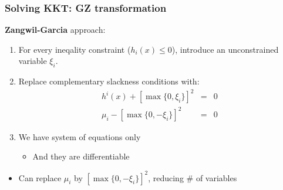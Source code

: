 \documentclass[bigger]{beamer}
\begin{document}
\begin{frame}%

\frametitle{Solving KKT: GZ transformation}

\textbf{Zangwil-Garcia} approach:

\begin{enumerate}
\item For every ineqality constraint ($h_{i}(x)\leq 0$), \newline
introduce an unconstrained variable $\xi _{i}$.

\item Replace complementary slackness conditions with:%
\begin{eqnarray*}
h^{i}(x)+[\max \{0,\xi _{i}\}]^{2} &=&0 \\
\mu _{i}-[\max \{0,-\xi _{i}\}]^{2} &=&0
\end{eqnarray*}

\item We have system of equations only

\begin{itemize}
\item And they are differentiable\bigskip
\end{itemize}
\end{enumerate}

\begin{itemize}
\item Can replace $\mu _{i}$ by $[\max \{0,-\xi _{i}\}]^{2}$, reducing \# of
variables
\end{itemize}


\end{frame}%
\end{document}
